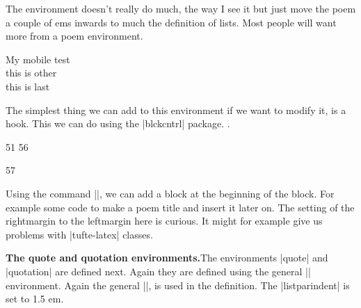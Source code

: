 The environment doesn't really do much, the way I see it but just move the poem a couple of ems inwards 
to much the definition of lists. Most people will want more from a poem environment.
\begin{Verse}
     My mobile test\\
      this is other\\
       this is last\\
\end{Verse}

The simplest thing we can add to this environment if we want to modify it, is a hook. This we can do using the |blckcntrl| package. .

\begin{teX}
\renewenvironment{verse}
50 {\let\\\@centercr
51 \relax{}%
56 \item\relax\PreVerse\relax}
57 {\endlist}
\end{teX}

Using the command |\PreVerse|, we can add a block at the beginning of the block. For example some code to make a poem title and insert it later on. The setting of the rightmargin to the leftmargin here is curious. It might for example give us problems with |tufte-latex| classes.

\begin{multicols}{2}
\textbf{The quote and quotation environments.}\quad The environments |quote| and |quotation| are defined next. Again they are defined using the general |\list| environment. Again the general |\list|, is used in the definition. The |listparindent| is set to 1.5 em.
\end{multicols}

\begin{teX}
\newenvironment{quotation}
               {\list{}{\listparindent 1.5em%
                        \itemindent\listparindent
                        \rightmargin\leftmargin
                        \parsep\z@ \@plus\p@}%
                \item\relax}
               {\endlist}
\end{teX}

